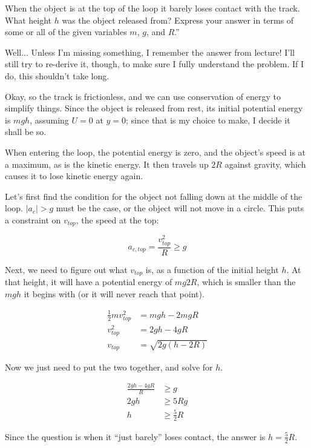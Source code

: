 \documentclass[8.01x]{subfiles}
\begin{document}
When the object is at the top of the loop it barely loses contact with the track. What height $h$ was the object released from? Express your answer in terms of some or all of the given variables $m$, $g$, and $R$.''

Well... Unless I'm missing something, I remember the answer from lecture! I'll still try to re-derive it, though, to make sure I fully understand the problem. If I do, this shouldn't take long.

Okay, so the track is frictionless, and we can use conservation of energy to simplify things. Since the object is released from rest, its initial potential energy is $m g h$, assuming $U = 0$ at $y = 0$; since that is my choice to make, I decide it shall be so.

When entering the loop, the potential energy is zero, and the object's speed is at a maximum, as is the kinetic energy. It then travels up $2 R$ against gravity, which causes it to lose kinetic energy again.

Let's first find the condition for the object not falling down at the middle of the loop. $|a_c| > g$ must be the case, or the object will not move in a circle. This puts a constraint on $v_{top}$, the speed at the top:

\begin{equation}
a_{c,top} = \frac{v_{top}^2}{R} \ge g
\end{equation}

Next, we need to figure out what $v_{top}$ is, as a function of the initial height $h$. At that height, it will have a potential energy of $m g 2 R$, which is smaller than the $m g h$ it begins with (or it will never reach that point).

\begin{align}
\frac{1}{2} m v_{top}^2 &= m g h - 2 m g R\\
v_{top}^2 &= 2 g h - 4 g R\\
v_{top} &= \sqrt{2g(h - 2 R)}
\end{align}

Now we just need to put the two together, and solve for $h$.

\begin{align}
\frac{2 g h - 4 g R}{R} &\ge g\\
2 g h &\ge 5 R g\\
h &\ge \frac{5}{2} R
\end{align}

Since the question is when it ``just barely'' loses contact, the answer is $\displaystyle h = \frac{5}{2} R$.
\end{document}
